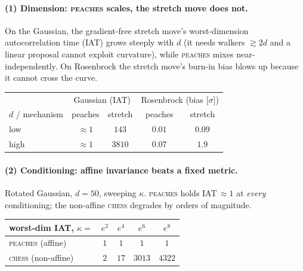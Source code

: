 \documentclass[11pt]{article}
\begin{document}
\paragraph{(1) Dimension: \textsc{peaches} scales, the stretch move does not.}
On the Gaussian, the gradient-free stretch move's worst-dimension
autocorrelation time (IAT) grows steeply with $d$ (it needs walkers
$\gtrsim 2d$ and a linear proposal cannot exploit curvature), while
\textsc{peaches} mixes near-independently. On Rosenbrock the stretch move's
burn-in bias blows up because it cannot cross the curve.
\begin{center}\small
\begin{tabular}{l cc cc}
\toprule
& \multicolumn{2}{c}{Gaussian (IAT)} & \multicolumn{2}{c}{Rosenbrock (bias [$\sigma$])}\\
$d$ / mechanism & peaches & stretch & peaches & stretch\\
\midrule
low      & $\approx1$ & $143$  & $0.01$ & $0.09$\\
high     & $\approx1$ & $3810$ & $0.07$ & $1.9$\\
\bottomrule
\end{tabular}
\end{center}

\paragraph{(2) Conditioning: affine invariance beats a fixed metric.}
Rotated Gaussian, $d{=}50$, sweeping $\kappa$. \textsc{peaches} holds
IAT$\,\approx\!1$ at \emph{every} conditioning; the non-affine \textsc{chess}
degrades by orders of magnitude.
\begin{center}\small
\begin{tabular}{l cccc}
\toprule
worst-dim IAT, $\kappa=$ & $e^2$ & $e^4$ & $e^6$ & $e^8$\\
\midrule
\textsc{peaches} (affine)   & $1$ & $1$ & $1$ & $1$\\
\textsc{chess} (non-affine) & $2$ & $17$ & $3013$ & $4322$\\
\bottomrule
\end{tabular}
\end{center}
\end{document}
